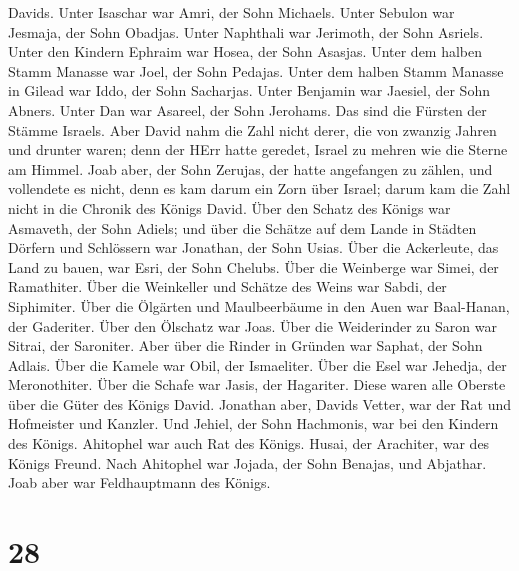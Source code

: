 Davids. Unter Isaschar war Amri, der Sohn Michaels.  Unter
Sebulon war Jesmaja, der Sohn Obadjas. Unter Naphthali war Jerimoth, der
Sohn Asriels.  Unter den Kindern Ephraim war Hosea, der
Sohn Asasjas. Unter dem halben Stamm Manasse war Joel, der Sohn Pedajas.
 Unter dem halben Stamm Manasse in Gilead war Iddo, der
Sohn Sacharjas. Unter Benjamin war Jaesiel, der Sohn Abners.
 Unter Dan war Asareel, der Sohn Jerohams. Das sind die
Fürsten der Stämme Israels.  Aber David nahm die Zahl nicht
derer, die von zwanzig Jahren und drunter waren; denn der HErr hatte
geredet, Israel zu mehren wie die Sterne am Himmel.  Joab
aber, der Sohn Zerujas, der hatte angefangen zu zählen, und vollendete
es nicht, denn es kam darum ein Zorn über Israel; darum kam die Zahl
nicht in die Chronik des Königs David.  Über den Schatz des
Königs war Asmaveth, der Sohn Adiels; und über die Schätze auf dem Lande
in Städten Dörfern und Schlössern war Jonathan, der Sohn Usias.
 Über die Ackerleute, das Land zu bauen, war Esri, der Sohn
Chelubs.  Über die Weinberge war Simei, der Ramathiter.
Über die Weinkeller und Schätze des Weins war Sabdi, der Siphimiter.
 Über die Ölgärten und Maulbeerbäume in den Auen war
Baal-Hanan, der Gaderiter. Über den Ölschatz war Joas. 
Über die Weiderinder zu Saron war Sitrai, der Saroniter. Aber über die
Rinder in Gründen war Saphat, der Sohn Adlais.  Über die
Kamele war Obil, der Ismaeliter. Über die Esel war Jehedja, der
Meronothiter.  Über die Schafe war Jasis, der Hagariter.
Diese waren alle Oberste über die Güter des Königs David. 
Jonathan aber, Davids Vetter, war der Rat und Hofmeister und Kanzler.
Und Jehiel, der Sohn Hachmonis, war bei den Kindern des Königs.
 Ahitophel war auch Rat des Königs. Husai, der Arachiter,
war des Königs Freund.  Nach Ahitophel war Jojada, der Sohn
Benajas, und Abjathar. Joab aber war Feldhauptmann des Königs.

\hypertarget{section-27}{%
\section{28}\label{section-27}}

